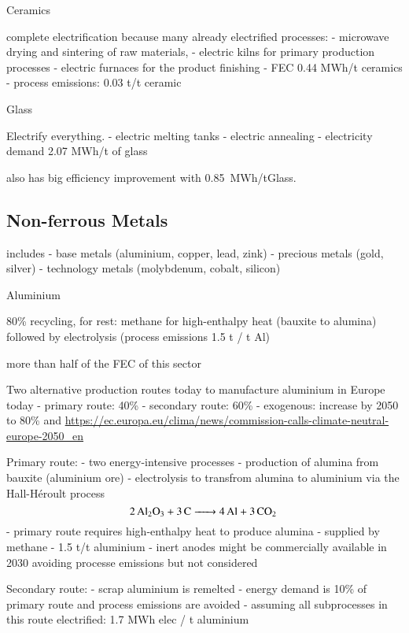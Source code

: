 Ceramics

complete electrification because many already electrified processes:
- microwave drying and sintering of raw materials,
- electric kilns for primary production processes
- electric furnaces for the product finishing
- FEC 0.44 MWh/t ceramics
- process emissions: 0.03 t\co/t ceramic

\cite{furszyferdelrioDecarbonizingCeramics2022a}

Glass

Electrify everything.
- electric melting tanks
- electric annealing
- electricity demand 2.07 MWh/t of glass 

\cite{furszyferdelrioDecarbonizingGlass2022}


 also has big efficiency improvement with 0.85~MWh\el/tGlass.

\subsection{Non-ferrous Metals}

includes
- base metals (aluminium, copper, lead, zink)
- precious metals (gold, silver)
- technology metals (molybdenum, cobalt, silicon)

Aluminium

80\% recycling, for rest: methane for high-enthalpy heat (bauxite to alumina) followed by electrolysis (process emissions 1.5 t \co / t Al)

more than half of the FEC of this sector

Two alternative production routes today to manufacture aluminium in Europe today
- primary route: 40\%
- secondary route: 60\%
- exogenous: increase by 2050 to 80\%  and \url{https://ec.europa.eu/clima/news/commission-calls-climate-neutral-europe-2050_en}

Primary route:
- two energy-intensive processes
- production of alumina from bauxite (aluminium ore)
- electrolysis to transfrom alumina to aluminium via the Hall-H\'{e}roult process
\begin{equation}
    \ce{2Al2O3 + 3C -> 4Al + 3\co}
\end{equation}
- primary route requires high-enthalpy heat to produce alumina - supplied by methane
- 1.5 t\co/t aluminium
- inert anodes might be commercially available in 2030 avoiding processe emissions  but not considered

Secondary route:
- scrap aluminium is remelted
- energy demand is 10\% of primary route and process emissions are avoided
- assuming all subprocesses in this route electrified: 1.7 MWh elec / t aluminium

